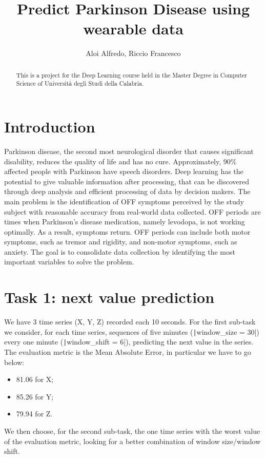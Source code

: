 \documentclass[12pt,a4paper,leqno]{article}
\title{Predict Parkinson Disease using wearable data}
\author{Aloi Alfredo, Riccio Francesco}
\begin{document}
	\maketitle
	\begin{abstract}
		This is a project for the Deep Learning course held in the Master Degree in Computer Science of Università degli Studi della Calabria.
	\end{abstract}
	\newpage
	\tableofcontents
	\newpage
	
	\section{Introduction}
	Parkinson disease, the second most neurological disorder that causes significant disability, reduces the quality of life and has no cure. Approximately, 90\% affected people with Parkinson have speech disorders. Deep learning has the potential to give valuable information after processing, that can be discovered through deep analysis and efficient processing of data by decision makers. The main problem is the identification of OFF symptoms perceived by the study subject with reasonable accuracy from real-world data collected. OFF periods are times when Parkinson’s disease medication, namely levodopa, is not	working optimally. As a result,	symptoms return. OFF periods can include both motor symptoms, such as tremor	and rigidity, and non-motor symptoms, such as anxiety. The goal is to consolidate data collection by
	identifying the most important variables to solve the problem.
		
	\newpage
	
	\section{Task 1: next value prediction}
	We have 3 time series (X, Y, Z) recorded each 10 seconds. For the first sub-task we consider, for each time series, sequences of five minutes (\texttt|window_size = 30|) every one minute (\texttt|window_shift = 6|), predicting the next value in the series. The evaluation metric is the Mean Absolute Error, in particular we have to go below:
	\begin{itemize}
		\item 81.06 for X;
		\item 85.26 for Y;
		\item 79.94 for Z.
	\end{itemize} We then choose, for the second sub-task, the one time series with the worst value of the evaluation metric, looking for a better combination of window size/window shift.
	
\end{document}
